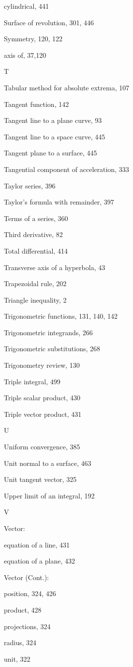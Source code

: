 \documentclass[10pt]{article}
\begin{document}
cylindrical, 441

Surface of revolution, 301, 446

Symmetry, 120, 122

axis of, 37,120

T

Tabular method for absolute extrema, 107

Tangent function, 142

Tangent line to a plane curve, 93

Tangent line to a space curve, 445

Tangent plane to a surface, 445

Tangential component of acceleration, 333

Taylor series, 396

Taylor's formula with remainder, 397

Terms of a series, 360

Third derivative, 82

Total differential, 414

Transverse axis of a hyperbola, 43

Trapezoidal rule, 202

Triangle inequality, 2

Trigonometric functions, 131, 140, 142

Trigonometric integrands, 266

Trigonometric substitutions, 268

Trigonometry review, 130

Triple integral, 499

Triple scalar product, 430

Triple vector product, 431

U

Uniform convergence, 385

Unit normal to a surface, 463

Unit tangent vector, 325

Upper limit of an integral, 192

V

Vector:

equation of a line, 431

equation of a plane, 432

Vector (Cont.):

position, 324, 426

product, 428

projections, 324

radius, 324

unit, 322
\end{document}

